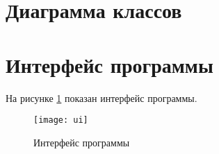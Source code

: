 \section{Диаграмма классов}

\section{Интерфейс программы}

На рисунке \ref{ui} показан интерфейс программы.

\begin{figure}[H]
	\centering
	\texttt{[image: ui]}
	\caption{Интерфейс программы}
	\label{ui}
\end{figure}

\clearpage
